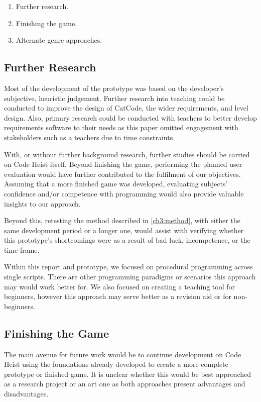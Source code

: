 \begin{enumerate}
    \item Further research.
    \item Finishing the game.
    \item Alternate genre approaches.
\end{enumerate}

\subsection{Further Research}

Most of the development of the prototype was based on the developer's subjective, heuristic judgement. Further research into teaching could be conducted to improve the design of CatCode, the wider requirements, and level design. Also, primary research could be conducted with teachers to better develop requirements software to their needs as this paper omitted engagement with stakeholders such as a teachers due to time constraints.

With, or without further background research, further studies should be carried on Code Heist itself. Beyond finishing the game, performing the planned user evaluation would have further contributed to the fulfilment of our objectives. Assuming that a more finished game was developed, evaluating subjects' confidence and/or competence with programming would also provide valuable insights to our approach.

Beyond this, retesting the method described in \autoref{ch3:method}, with either the same development period or a longer one, would assist with verifying whether this prototype's shortcomings were as a result of bad luck, incompetence, or the time-frame.

Within this report and prototype, we focused on procedural programming across single scripts. There are other programming paradigms or scenarios this approach may would work better for. We also focused on creating a teaching tool for beginners, however this approach may serve better as a revision aid or for non-beginners. 

\subsection{Finishing the Game}

The main avenue for future work would be to continue development on Code Heist using the foundations already developed to create a more complete prototype or finished game. It is unclear whether this would be best approached as a research project or an art one as both approaches present advantages and disadvantages.

